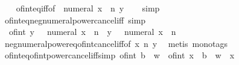 \begin{isabellebody}
%
\isadelimproof
\ \ %
\endisadelimproof
%
\isatagproof
{}\isamarkupfalse%
\ of{\isacharunderscore}{\kern0pt}int{\isacharunderscore}{\kern0pt}eq{\isacharunderscore}{\kern0pt}iff{\isacharbrackleft}{\kern0pt}of\ {\isachardoublequoteopen}{\isacharparenleft}{\kern0pt}{\isacharminus}{\kern0pt}\ numeral\ x{\isacharparenright}{\kern0pt}\ {\isacharcircum}{\kern0pt}\ n{\isachardoublequoteclose}\ y{\isacharbrackright}{\kern0pt}\isanewline
\ \ \isamarkupfalse%
\ simp%
\endisatagproof
{\isafoldproof}%
%
\isadelimproof
\isanewline
%
\endisadelimproof
\isanewline
{}\isamarkupfalse%
\ of{\isacharunderscore}{\kern0pt}int{\isacharunderscore}{\kern0pt}eq{\isacharunderscore}{\kern0pt}neg{\isacharunderscore}{\kern0pt}numeral{\isacharunderscore}{\kern0pt}power{\isacharunderscore}{\kern0pt}cancel{\isacharunderscore}{\kern0pt}iff\ {\isacharbrackleft}{\kern0pt}simp{\isacharbrackright}{\kern0pt}{\isacharcolon}{\kern0pt}\isanewline
\ \ {\isachardoublequoteopen}of{\isacharunderscore}{\kern0pt}int\ y\ {\isacharequal}{\kern0pt}\ {\isacharparenleft}{\kern0pt}{\isacharminus}{\kern0pt}\ numeral\ x{\isacharparenright}{\kern0pt}\ {\isacharcircum}{\kern0pt}\ n\ {\isasymlongleftrightarrow}\ y\ {\isacharequal}{\kern0pt}\ {\isacharparenleft}{\kern0pt}{\isacharminus}{\kern0pt}\ numeral\ x{\isacharparenright}{\kern0pt}\ {\isacharcircum}{\kern0pt}\ n{\isachardoublequoteclose}\isanewline
%
\isadelimproof
\ \ %
\endisadelimproof
%
\isatagproof
{}\isamarkupfalse%
\ neg{\isacharunderscore}{\kern0pt}numeral{\isacharunderscore}{\kern0pt}power{\isacharunderscore}{\kern0pt}eq{\isacharunderscore}{\kern0pt}of{\isacharunderscore}{\kern0pt}int{\isacharunderscore}{\kern0pt}cancel{\isacharunderscore}{\kern0pt}iff{\isacharbrackleft}{\kern0pt}of\ x\ n\ y{\isacharbrackright}{\kern0pt}\ \isamarkupfalse%
\ {\isacharparenleft}{\kern0pt}metis\ {\isacharparenleft}{\kern0pt}mono{\isacharunderscore}{\kern0pt}tags{\isacharparenright}{\kern0pt}{\isacharparenright}{\kern0pt}%
\endisatagproof
{\isafoldproof}%
%
\isadelimproof
\isanewline
%
\endisadelimproof
\isanewline
{}\isamarkupfalse%
\ of{\isacharunderscore}{\kern0pt}int{\isacharunderscore}{\kern0pt}eq{\isacharunderscore}{\kern0pt}of{\isacharunderscore}{\kern0pt}int{\isacharunderscore}{\kern0pt}power{\isacharunderscore}{\kern0pt}cancel{\isacharunderscore}{\kern0pt}iff{\isacharbrackleft}{\kern0pt}simp{\isacharbrackright}{\kern0pt}{\isacharcolon}{\kern0pt}\ {\isachardoublequoteopen}{\isacharparenleft}{\kern0pt}of{\isacharunderscore}{\kern0pt}int\ b{\isacharparenright}{\kern0pt}\ {\isacharcircum}{\kern0pt}\ w\ {\isacharequal}{\kern0pt}\ of{\isacharunderscore}{\kern0pt}int\ x\ {\isasymlongleftrightarrow}\ b\ {\isacharcircum}{\kern0pt}\ w\ {\isacharequal}{\kern0pt}\ x{\isachardoublequoteclose}\isanewline

\end{isabellebody}
